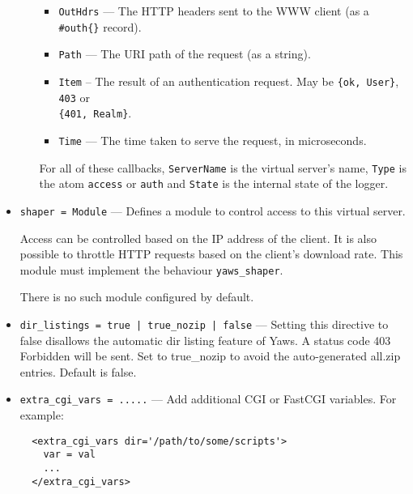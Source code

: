 \documentclass[11pt,oneside,english]{book}
\newcommand{\Yaws}            %
        {{\sc Yaws}}
\begin{document}
\begin{itemize}
\begin{itemize}
\begin{itemize}
                      \item \verb+OutHdrs+ --- The HTTP headers sent to the WWW
                        client (as a \verb+#outh{}+ record).

                      \item \verb+Path+ --- The URI path of the request (as a
                        string).

                      \item \verb+Item+ -- The result of an authentication
                        request. May be \verb+{ok, User}+, \verb+403+ or\\
                        \verb+{401, Realm}+.

                      \item \verb+Time+ --- The time taken to serve the request,
                        in microseconds.
                      \end{itemize}

              For all of these callbacks, \verb+ServerName+ is the virtual
              server's name, \verb+Type+ is the atom \verb+access+ or
              \verb+auth+ and \verb+State+ is the internal state of the logger.

              \end{itemize}

\item       \verb+shaper = Module+ ---
              Defines a module to control access to this virtual server.

              Access can be controlled based on the IP address of the client. It
              is also possible to throttle HTTP requests based on the client's
              download rate. This module must implement the behaviour
              \verb+yaws_shaper+.

              There is no such module configured by default.

\item       \verb+dir_listings = true | true_nozip | false+ ---
             Setting this directive to false disallows the automatic dir listing
             feature of \Yaws{}. A status code 403 Forbidden will be sent.  Set
             to true\_nozip to avoid the auto-generated all.zip entries. Default
             is false.

\item       \verb+extra_cgi_vars = .....+ ---
             Add additional CGI or FastCGI variables. For example:
\begin{verbatim}
  <extra_cgi_vars dir='/path/to/some/scripts'>
    var = val
    ...
  </extra_cgi_vars>
\end{verbatim}


\end{itemize}
\end{document}

